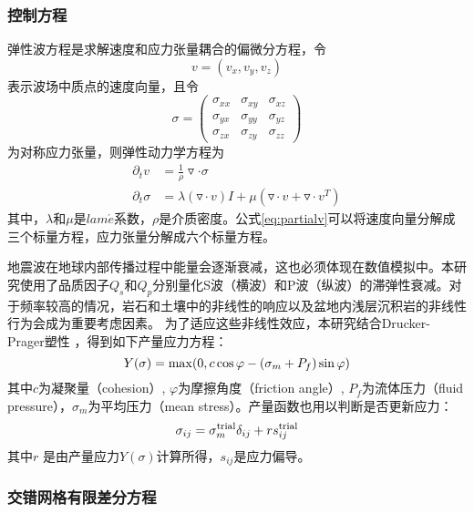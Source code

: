 \subsubsection{控制方程}
弹性波方程是求解速度和应力张量耦合的偏微分方程，令
\begin{equation}
  v = (v_x, v_y, v_z)
  \label{eq:vvvv}
\end{equation}
表示波场中质点的速度向量，且令
\begin{equation}
  \sigma = \begin{pmatrix}
\sigma_{xx} & \sigma_{xy} & \sigma_{xz} \\
\sigma_{yx} & \sigma_{yy} & \sigma_{yz} \\
\sigma_{zx} & \sigma_{zy} & \sigma_{zz}
\end{pmatrix}
\end{equation}
为对称应力张量，则弹性动力学方程为
\begin{equation}
\begin{aligned}
\partial _t v &= \frac{1}{\rho}\triangledown \cdot \sigma  \\
\partial _{t}\sigma &= \lambda(\triangledown \cdot v)I + \mu(\triangledown \cdot v + \triangledown \cdot v^T)
\end{aligned}
  \label{eq:partialv}
\end{equation}
其中，$\lambda$和$\mu$是$lam\acute{e}$系数，$\rho$是介质密度。公式\ref{eq:partialv}可以将速度向量分解成三个标量方程，应力张量分解成六个标量方程。

地震波在地球内部传播过程中能量会逐渐衰减，这也必须体现在数值模拟中。本研究使用了品质因子$Q_s$和$Q_p$分别量化S波（横波）和P波（纵波）的滞弹性衰减。对于频率较高的情况，岩石和土壤中的非线性的响应以及盆地内浅层沉积岩的非线性行为会成为重要考虑因素。 为了适应这些非线性效应，本研究结合Drucker-Prager塑性 \citep {roten2016high}，得到如下产量应力方程：
\begin{equation}
Y(\sigma)={\rm max}(0, c \cos \varphi - ( \sigma_{m} + P_{f} ) \sin\varphi)
\end{equation}
其中$c$为凝聚量（cohesion）, $\varphi$为摩擦角度（friction angle）, $P_{f}$为流体压力（fluid
pressure），$\sigma_{m}$为平均压力（mean stress）。产量函数也用以判断是否更新应力：
\begin{equation}
\sigma_{ij} = \sigma_{m}^{\rm trial} \delta_{ij} + r s_{ij}^{\rm{trial}}
\end{equation}
其中$r$ 是由产量应力$Y(\sigma)$计算所得，$s_{ij}$是应力偏导。

\subsubsection{交错网格有限差分方程}


